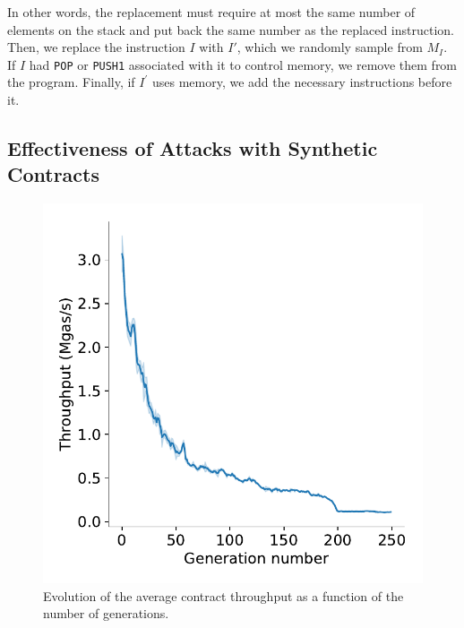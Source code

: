   In other words, the replacement must require at most the same number of elements on the stack and put back the same number as the replaced instruction. Then, we replace the instruction $I$ with $I'$, which we randomly sample from $M_I$. If $I$ had \lstinline{POP} or \lstinline{PUSH1} associated with it to control memory, we remove them from the program. Finally, if $I^\prime$ uses memory, we add the necessary instructions before it.

  \subsection{Effectiveness of Attacks with Synthetic Contracts}
  \begin{figure}[tb]
    \centering
    \includegraphics[width=.8\columnwidth]{./3-vm-security/figures/ga-contract-gas-results.pdf}
    \caption[Evolution of the throughput as a function of the number of generations]{Evolution of the average contract throughput as a function of the number of generations.}
    \label{fig:throughput-evolution}
  \end{figure}

